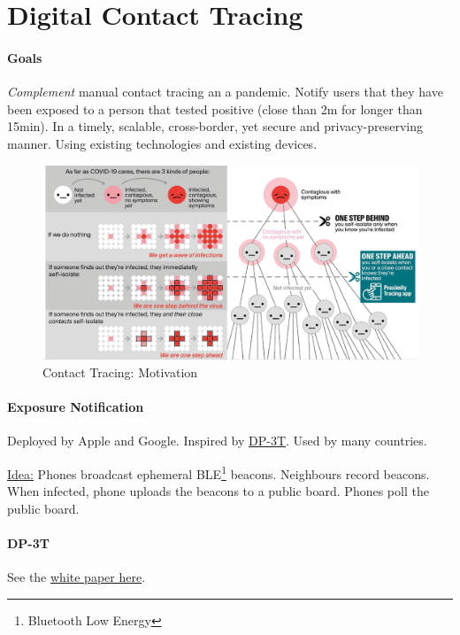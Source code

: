 \section{Digital Contact Tracing}

\paragraph{Goals}
\textit{Complement} manual contact tracing an a pandemic.
Notify users that they have been exposed to a person that tested positive (close than 2m for longer than 15min).
In a timely, scalable, cross-border, yet secure and privacy-preserving manner.
Using existing technologies and existing devices.

\begin{figure}[h]
	\centering
	\includegraphics[scale=0.45]{images/11-why-tracing.png}
	\caption{Contact Tracing: Motivation}
	\label{fig:why-tracing}
\end{figure}

\paragraph{Exposure Notification}
Deployed by Apple and Google. Inspired by \href{https://github.com/DP-3T/documents}{DP-3T}. Used by many countries.

\underline{Idea:}
Phones broadcast ephemeral BLE\footnote{Bluetooth Low Energy} beacons.
Neighbours record beacons.
When infected, phone uploads the beacons to a public board.
Phones poll the public board.

\paragraph{DP-3T}
See the \href{https://github.com/DP-3T/documents/blob/master/DP3T\%20White\%20Paper.pdf}{white paper here}.

